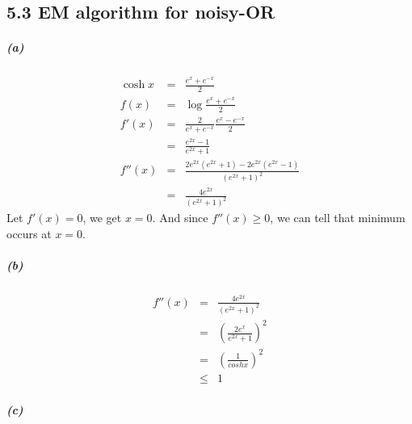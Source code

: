 \documentclass{article}
\begin{document}
\subsection*{5.3 EM algorithm for noisy-OR}
\subparagraph*{(a)}
\begin{eqnarray*}
	\cosh x &=& \frac{e^x + e^{-x}}{2}\\
	f(x) &=& \log \frac{e^x + e^{-x}}{2}\\
	f'(x) &=& \frac{2}{e^x + e^{-x}} \frac{e^x - e^{-x}}{2}\\
	&=& \frac{e^{2x}-1}{e^{2x}+1}\\
	f''(x) &=& \frac{2e^{2x}(e^{2x}+1) - 2e^{2x}(e^{2x}-1)}{(e^{2x}+1)^2}\\
	&=& \frac{4e^{2x}}{(e^{2x}+1)^2}
\end{eqnarray*}
Let $f'(x)=0$, we get $x=0$. And since $f''(x) \ge 0$, we can tell that minimum occurs at $x=0$.

\subparagraph*{(b)}
\begin{eqnarray*}
	f''(x) &=& \frac{4e^{2x}}{(e^{2x}+1)^2}\\
	&=& \left(\frac{2e^x}{e^{2x}+1}\right)^2\\
	&=& \left(\frac{1}{coshx}\right)^2\\
	&\le& 1
\end{eqnarray*}

\subparagraph*{(c)}
\end{document}
